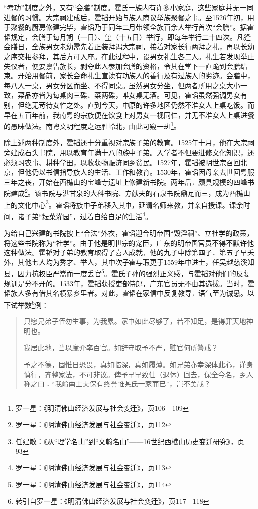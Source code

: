 “考功”制度之外，又有“会膳”制度。霍氏一族内有许多小家庭，这些家庭并无一同进餐的习惯。大宗祠建成后，霍韬开始与族人商议举族聚餐之事。至1526年初，用于聚餐的厨房修建完毕，霍韬乃于同年二月带领全族百余人举行首次“会膳”。据霍韬规定，会膳于每月朔（一日）、望（十五日）举行，即每年举行二十四次。凡逢会膳日，全族男女老幼需先着正装拜谒大宗祠，接着对家长行两拜之礼，再以长幼之序交相参拜，其后方可入座。在此过程中，设男女礼生各二人。礼生若发现举止失仪者，便要禀告族长，剥夺此人参加会膳的资格，令其在堂下一直跪到会膳结束。开始用餐前，家长会命礼生宣读有功族人的善行及有过族人的劣迹。会膳中，每八人一桌，男女分区而坐、不得同桌。虽然男女分坐，但两者所用之桌大小一致，菜品亦皆为每桌肉三碟、菜两碟，唯女桌无酒。可见，霍韬虽然强调男女有别，但绝无苛待女性之处。直到今天，中原的许多地区仍然不准女人上桌吃饭。而早在五百年前，我南粤的宗族便在饮食上对男女一视同仁，并无不准女人上桌进餐的愚昧做法。南粤文明程度之远胜岭北，由此可窥一斑\footnote{罗一星：《明清佛山经济发展与社会变迁》，页106—109}。

除上述两种制度外，霍韬还十分重视对宗族子弟的教育。1525年十月，他在大宗祠旁建成石头书院，用以教育年满十八的族中子弟。入学者不但要进修文化知识，还必须习农事、耕种学田，以收获物赈济同乡贫民。1527年，霍韬被明世宗召回北京，但他仍以书信指导族人的生活、工作和教育。1530年，霍韬因母亲去世回粤服三年之丧，开始在西樵山的宝峰寺遗址上修建新书院。两年后，颇具规模的四峰书院建成\footnote{罗一星：《明清佛山经济发展与社会变迁》，页112}。该书院与湛甘泉的大科书院、方献夫的石泉书院鼎足而三，成为西樵山上的文化中心\footnote{任建敏：《从“理学名山”到“文翰名山”——16世纪西樵山历史变迁研究》，页93}。霍韬将族中子弟移入其中，延请名师来教，并亲自授课。课余时间，诸子弟“耘菜灌园”，过着自给自足的生活\footnote{罗一星：《明清佛山经济发展与社会变迁》，页113}。

为给自己兴建的书院披上“合法”外衣，霍韬迎合明帝国“毁淫祠”、立社学的政策，将这些书院称为“社学”。由于他是明世宗的宠臣，广东的明帝国官员不得不默许他这种做法。霍韬对子弟的教育取得了喜人成就，他的九子中除第四子、第五子早夭外，其他七人均为秀才、举人，其中次子霍与瑕更于1559年中进士，任吴越慈溪知县，因力抗权臣严嵩而一度丢官\footnote{罗一星：《明清佛山经济发展与社会变迁》，页114}。霍氏子孙的强烈正义感，与霍韬对他们的反复规训是分不开的。1533年，霍韬获授吏部侍郎，广东官员无不由其选拔。当时，霍韬族人多有借其名横暴乡里者。对此，霍韬在家信中反复教导，语气至为诚恳。以下试举数\footnote{转引自罗一星：《明清佛山经济发展与社会变迁》，页117—118}例：

\begin{quote}

只愿兄弟子侄勿生事，为我累。家中如此尽够了，若不知足，是得罪天地神明也。

我居此地，当以廉介率百官。如辞守取予不严，赃官何所警戒？

予之不德，固惟日恐畏，真如临深，真如履薄。如兄弟亦幸深体此心，谨身慎行，齐整家法，不可非议。俾予早早致仕（退休）回去，保全今名，乡人称之曰：“我岭南士夫保有终誉惟某氏一家而已”，岂不美哉？

\end{quote}

